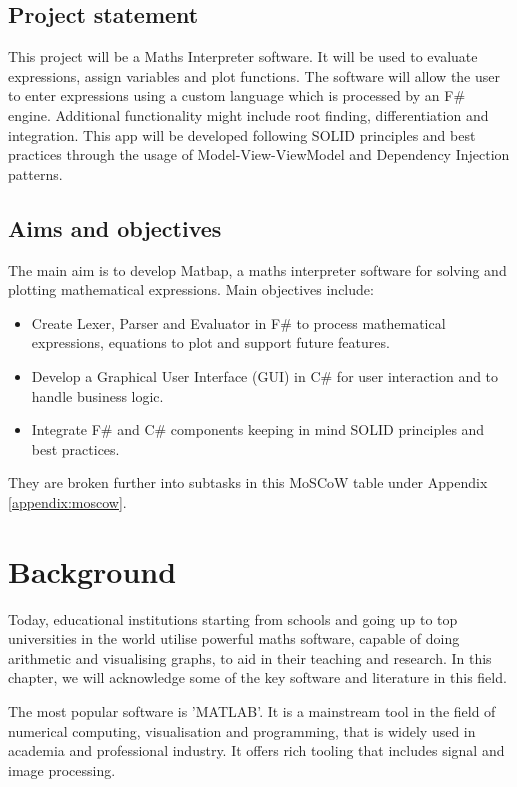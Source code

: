\documentclass[a4paper, oneside, 11pt]{report}
\begin{document}
\section{Project statement}
This project will be a Maths Interpreter software. It will be used to evaluate expressions, assign variables and plot functions. The software will allow the user to enter expressions using a custom language which is processed by an F\# engine. Additional functionality might include root finding, differentiation and integration. This app will be developed following SOLID principles and best practices through the usage of Model-View-ViewModel and Dependency Injection patterns.

\section{Aims and objectives}
The main aim is to develop Matbap, a maths interpreter software for solving and plotting mathematical expressions. Main objectives include:
\begin{itemize}
    \item Create Lexer, Parser and Evaluator in F\# to process mathematical expressions, equations to plot and support future features.
    \item Develop a Graphical User Interface (GUI) in C\# for user interaction and to handle business logic.
    \item Integrate F\# and C\# components keeping in mind SOLID principles and best practices.
\end{itemize}

\noindent %
They are broken further into subtasks in this MoSCoW table under Appendix \ref{appendix:moscow}.


\chapter{Background}
Today, educational institutions starting from schools and going up to top universities in the world utilise powerful maths software, capable of doing arithmetic and visualising graphs, to aid in their teaching and research. In this chapter, we will acknowledge some of the key software and literature in this field.

The most popular software is 'MATLAB'\cite{Matlab:2023}. It is a mainstream tool in the field of numerical computing, visualisation and programming, that is widely used in academia and professional industry. It offers rich tooling that includes signal and image processing.  
\end{document}
